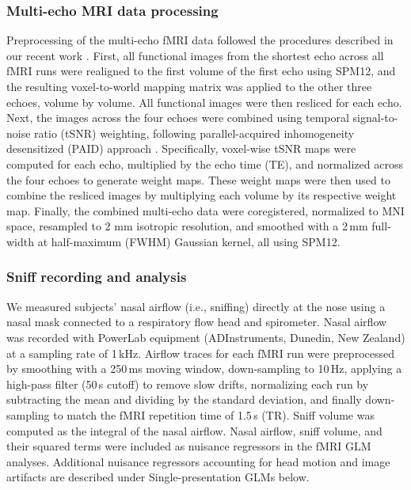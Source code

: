 \documentclass[9pt,twoside,lineno]{pnas-new}
\begin{document}
\subsubsection*{Multi-echo MRI data processing}

Preprocessing of the multi-echo fMRI data followed the procedures described in our recent work \cite{liu2025distinct}. First, all functional images from the shortest echo across all fMRI runs were realigned to the first volume of the first echo using SPM12, and the resulting voxel-to-world mapping matrix was applied to the other three echoes, volume by volume. All functional images were then resliced for each echo. Next, the images across the four echoes were combined using temporal signal-to-noise ratio (tSNR) weighting, following parallel-acquired inhomogeneity desensitized (PAID) approach \cite{RN524}. Specifically, voxel-wise tSNR maps were computed for each echo, multiplied by the echo time (TE), and normalized across the four echoes to generate weight maps. These weight maps were then used to combine the resliced images by multiplying each volume by its respective weight map. Finally, the combined multi-echo data were coregistered, normalized to MNI space, resampled to 2 mm isotropic resolution, and smoothed with a 2\,mm full-width at half-maximum (FWHM) Gaussian kernel, all using SPM12.

\subsubsection*{Sniff recording and analysis}

We measured subjects’ nasal airflow (i.e., sniffing) directly at the nose using a nasal mask connected to a respiratory flow head and spirometer. Nasal airflow was recorded with PowerLab equipment (ADInstruments, Dunedin, New Zealand) at a sampling rate of 1\,kHz. Airflow traces for each fMRI run were preprocessed by smoothing with a 250\,ms moving window, down-sampling to 10\,Hz, applying a high-pass filter (50\,s cutoff) to remove slow drifts, normalizing each run by subtracting the mean and dividing by the standard deviation, and finally down-sampling to match the fMRI repetition time of 1.5\,s (TR). Sniff volume was computed as the integral of the nasal airflow. Nasal airflow, sniff volume, and their squared terms were included as nuisance regressors in the fMRI GLM analyses. Additional nuisance regressors accounting for head motion and image artifacts are described under Single-presentation GLMs below.
\end{document}

